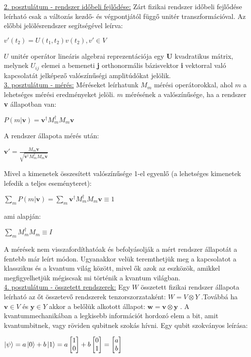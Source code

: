 \underline{2. posztulátum - rendszer időbeli fejlődése:} Zárt fizikai rendszer időbeli fejlődése leírható csak a változás kezdő- és végpontjától függő unitér transzformációval. Az előbbi jelölésrendszer segítségével leírva: 
\begin{center}
$v'(t_2) = U(t_1,t_2)v(t_2), v' \in V$
\end{center}
$ U $ unitér operátor lineáris algebrai reprezentációja egy \textbf{U} kvadratikus mátrix, melynek $U_{ij}$ elemei a bemeneti \textbf{j} orthonormális bázisvektor \textbf{i} vektorral való kapcsolatát jelképező valószínűségi amplitúdókat jelölik.\\

\underline{3. posztulátum - mérés:} Méréseket leírhatunk $M_m$  mérési operátorokkal, ahol $m$ a lehetséges mérési eredményeket jelöli. $m$ mérésének a valószínűsége, ha a rendszer \textbf{v} állapotban van:
\begin{center}
$P(m|\textbf{v})= {\textbf{v}}^\dagger M_m^\dagger M_m \textbf{v} $
\end{center}
A rendszer állapota mérés után:
\begin{center}
$ {\textbf{v}}' = \frac{M_m \textbf{v}}{\sqrt{{\textbf{v}}^\dagger M_m^\dagger M_m \textbf{v}}}  $
\end{center}
Mivel a kimenetek összesített valószínűsége 1-el egyenlő (a lehetséges kimenetek lefedik a teljes eseményteret):
\begin{center}
$ \sum_m P(m|\textbf{v}) = \sum_m {\textbf{v}}^\dagger M_m^\dagger M_m \textbf{v} \equiv 1$
\end{center}
ami alapján:
\begin{center}
$\sum_m M_m^\dagger M_m \equiv I $
\end{center}
A mérések nem visszafordíthatóak és befolyásolják a mért rendszer állapotát a fentebb már leírt módon. Ugyanakkor velük teremthetjük meg a kapcsolatot a klasszikus és a kvantum világ között, mivel ők azok az eszközök,  amikkel megfigyelhetjük mégiscsak mi történik a kvantum világban.
\\
\underline{4. posztulátum - összetett rendszerek:}
Egy $ W $ összetett fizikai rendszer állapota leírható az őt összetevő rendszerek tenzorszorzataként:
$ W=V \otimes Y $ .Továbbá ha $\textbf{v} \in V  $  és  $ \textbf{y} \in Y $ akkor a belőlük alkotott állapot: $ \textbf{w}=\textbf{v}\otimes \textbf{y} $ .
A kvantummechanikában a legkisebb információt hordozó elem a bit, amit kvantumbitnek, vagy röviden qubitnek  szokás hívni. Egy qubit szokványos leírása:
\begin{center}
$ \ket{\psi}=a\ket{0}+b\ket{1}=a \begin{bmatrix}1\\0\end{bmatrix}+ b \begin{bmatrix}0\\1\end{bmatrix} = \begin{bmatrix} a\\b \end{bmatrix} $
\end{center}
